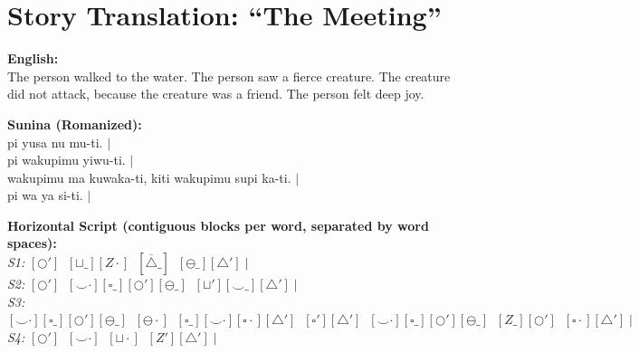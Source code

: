 \documentclass[12pt, a4paper]{article}
\begin{document}
\section{Story Translation: ``The Meeting''}
\textbf{English:} \\
The person walked to the water. The person saw a fierce creature. The creature did not attack, because the creature was a friend. The person felt deep joy.

\vspace{0.5em}
\textbf{Sunina (Romanized):} \\
pi yusa nu mu-ti. $\vert{}$ \\
pi wakupimu yiwu-ti. $\vert{}$ \\
wakupimu ma kuwaka-ti, kiti wakupimu supi ka-ti. $\vert{}$ \\
pi wa ya si-ti. $\vert{}$

\vspace{0.5em}
\textbf{Horizontal Script (contiguous blocks per word, separated by word spaces):} \\
\textit{S1:} $[\bigcirc'] \;\; [\sqcup\_][Z\cdot] \;\; [\overline{\triangle}\_] \;\; [\ominus\_][\triangle'] \mid$ \\
\textit{S2:} $[\bigcirc'] \;\; [\smile\cdot][\square\_][\bigcirc'][\ominus\_] \;\; [\sqcup'][\smile\_][\triangle'] \mid$ \\
\textit{S3:} $[\smile\cdot][\square\_][\bigcirc'][\ominus\_] \;\; [\ominus\cdot] \;\; [\square\_][\smile\cdot][\square\cdot][\triangle'] \;\; [\square'][\triangle'] \;\; [\smile\cdot][\square\_][\bigcirc'][\ominus\_] \;\; [Z\_][\bigcirc'] \;\; [\square\cdot][\triangle'] \mid$ \\
\textit{S4:} $[\bigcirc'] \;\; [\smile\cdot] \;\; [\sqcup\cdot] \;\; [Z'][\triangle'] \mid$
\end{document}
